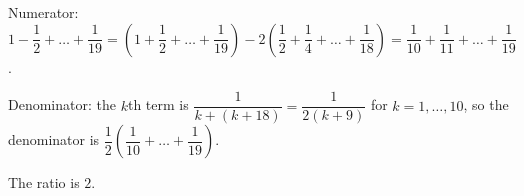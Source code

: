 Numerator: $1-\dfrac{1}{2}+\dots+\dfrac{1}{19}=\left(1+\dfrac{1}{2}+\dots+\dfrac{1}{19}\right)-2\left(\dfrac{1}{2}+\dfrac{1}{4}+\dots+\dfrac{1}{18}\right)=\dfrac{1}{10}+\dfrac{1}{11}+\dots+\dfrac{1}{19}$.

Denominator: the $k$th term is $\dfrac{1}{k+(k+18)}=\dfrac{1}{2(k+9)}$ for $k=1,\dots,10$, so the denominator is $\dfrac{1}{2}\left(\dfrac{1}{10}+\dots+\dfrac{1}{19}\right)$.

The ratio is $\boxed{2}$.
